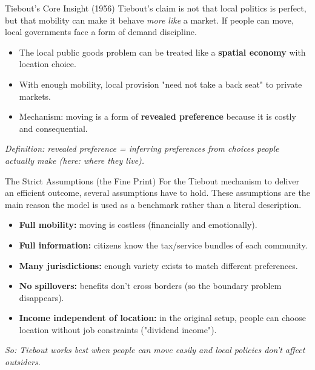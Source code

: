 \documentclass[10pt]{beamer}
\begin{document}
\begin{frame}{Tiebout's Core Insight (1956)}
Tiebout’s claim is not that local politics is perfect, but that mobility can make it behave \textit{more like} a market.
If people can move, local governments face a form of demand discipline.

\begin{itemize}
\item The local public goods problem can be treated like a \textbf{spatial economy} with location choice.
\item With enough mobility, local provision "need not take a back seat" to private markets.
\item Mechanism: moving is a form of \textbf{revealed preference} because it is costly and consequential.
\end{itemize}

\vspace{0.15cm}
\footnotesize
\textit{Definition: revealed preference = inferring preferences from choices people actually make (here: where they live).}
\end{frame}

\begin{frame}{The Strict Assumptions (the Fine Print)}
For the Tiebout mechanism to deliver an efficient outcome, several assumptions have to hold.
These assumptions are the main reason the model is used as a benchmark rather than a literal description.

\begin{itemize}
\item \textbf{Full mobility:} moving is costless (financially and emotionally).
\item \textbf{Full information:} citizens know the tax/service bundles of each community.
\item \textbf{Many jurisdictions:} enough variety exists to match different preferences.
\item \textbf{No spillovers:} benefits don't cross borders (so the boundary problem disappears).
\item \textbf{Income independent of location:} in the original setup, people can choose location without job constraints ("dividend income").
\end{itemize}

\vspace{0.1cm}
\footnotesize
\textit{So: Tiebout works best when people can move easily and local policies don't affect outsiders.}
\end{frame}
\end{document}
